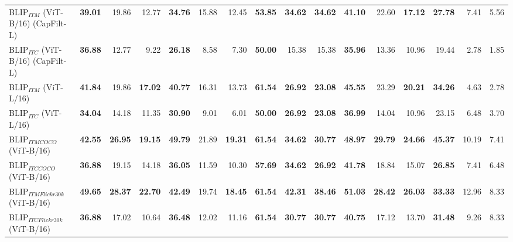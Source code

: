\begin{table*}[!ht]
\begin{adjustbox}{max width=\textwidth}
\begin{tabular}{l|rrr|rrr|rrr|rrr|rrr}
 BLIP$_{ITM}$ (ViT-B/16) (CapFilt-L) & \textbf{39.01} & 19.86          & 12.77          & \textbf{34.76} & 15.88          & 12.45          & \textbf{53.85} & \textbf{34.62} & \textbf{34.62} & \textbf{41.10} & 22.60          & \textbf{17.12} & \textbf{27.78} & 7.41           & 5.56           \\
 BLIP$_{ITC}$ (ViT-B/16) (CapFilt-L) & \textbf{36.88} & 12.77          & 9.22           & \textbf{26.18} & 8.58           & 7.30           & \textbf{50.00} & 15.38          & 15.38          & \textbf{35.96} & 13.36          & 10.96          & 19.44          & 2.78           & 1.85           \\
 BLIP$_{ITM}$ (ViT-L/16)             & \textbf{41.84} & 19.86          & \textbf{17.02} & \textbf{40.77} & 16.31          & 13.73          & \textbf{61.54} & \textbf{26.92} & \textbf{23.08} & \textbf{45.55} & 23.29          & \textbf{20.21} & \textbf{34.26} & 4.63           & 2.78           \\
 BLIP$_{ITC}$ (ViT-L/16)             & \textbf{34.04} & 14.18          & 11.35          & \textbf{30.90} & 9.01           & 6.01           & \textbf{50.00} & \textbf{26.92} & \textbf{23.08} & \textbf{36.99} & 14.04          & 10.96          & 23.15          & 6.48           & 3.70           \\
 BLIP$_{ITM COCO}$ (ViT-B/16)        & \textbf{42.55} & \textbf{26.95} & \textbf{19.15} & \textbf{49.79} & 21.89          & \textbf{19.31} & \textbf{61.54} & \textbf{34.62} & \textbf{30.77} & \textbf{48.97} & \textbf{29.79} & \textbf{24.66} & \textbf{45.37} & 10.19          & 7.41           \\
 BLIP$_{ITC COCO}$ (ViT-B/16)        & \textbf{36.88} & 19.15          & 14.18          & \textbf{36.05} & 11.59          & 10.30          & \textbf{57.69} & \textbf{34.62} & \textbf{26.92} & \textbf{41.78} & 18.84          & 15.07          & \textbf{26.85} & 7.41           & 6.48           \\
 BLIP$_{ITM Flickr30k}$ (ViT-B/16)   & \textbf{49.65} & \textbf{28.37} & \textbf{22.70} & \textbf{42.49} & 19.74          & \textbf{18.45} & \textbf{61.54} & \textbf{42.31} & \textbf{38.46} & \textbf{51.03} & \textbf{28.42} & \textbf{26.03} & \textbf{33.33} & 12.96          & 8.33           \\
 BLIP$_{ITC Flickr30k}$ (ViT-B/16)   & \textbf{36.88} & 17.02          & 10.64          & \textbf{36.48} & 12.02          & 11.16          & \textbf{61.54} & \textbf{30.77} & \textbf{30.77} & \textbf{40.75} & 17.12          & 13.70          & \textbf{31.48} & 9.26           & 8.33           \\

\end{tabular}
\end{adjustbox}
\end{table*}
